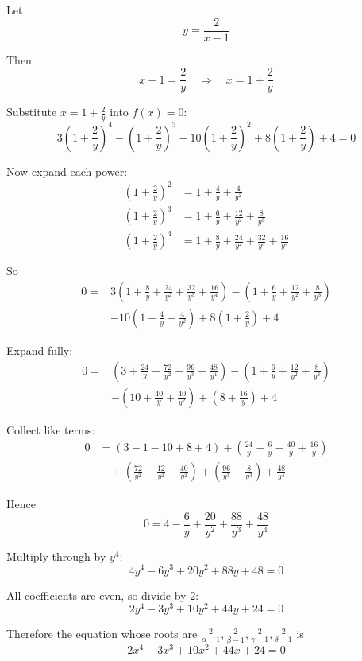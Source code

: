 \documentclass[leqno]{article}
\begin{document}
\begin{enumerate}[
  label=\textbf{\arabic*.},
  leftmargin=*,
  topsep=0pt,
  partopsep=0pt,
  parsep=0pt
]
\begin{djsSolution}
\begin{enumerate}[label=\textbf{(\alph*)}]
Let
\[
y=\frac{2}{x-1}
\]

Then
\[
x-1=\frac{2}{y}\quad\Longrightarrow\quad x=1+\frac{2}{y}
\]

Substitute \(x=1+\frac{2}{y}\) into \(f(x)=0\):
\[
3\left(1+\frac{2}{y}\right)^4-\left(1+\frac{2}{y}\right)^3-10\left(1+\frac{2}{y}\right)^2+8\left(1+\frac{2}{y}\right)+4=0
\]

Now expand each power:
\begin{align*}
\left(1+\frac{2}{y}\right)^2&=1+\frac{4}{y}+\frac{4}{y^2} \\
\left(1+\frac{2}{y}\right)^3&=1+\frac{6}{y}+\frac{12}{y^2}+\frac{8}{y^3} \\
\left(1+\frac{2}{y}\right)^4&=1+\frac{8}{y}+\frac{24}{y^2}+\frac{32}{y^3}+\frac{16}{y^4}
\end{align*}

So
\begin{align*}
0={}&3\left(1+\frac{8}{y}+\frac{24}{y^2}+\frac{32}{y^3}+\frac{16}{y^4}\right)
-\left(1+\frac{6}{y}+\frac{12}{y^2}+\frac{8}{y^3}\right) \\
&-10\left(1+\frac{4}{y}+\frac{4}{y^2}\right)
+8\left(1+\frac{2}{y}\right)+4
\end{align*}

Expand fully:
\begin{align*}
0={}&\left(3+\frac{24}{y}+\frac{72}{y^2}+\frac{96}{y^3}+\frac{48}{y^4}\right)
-\left(1+\frac{6}{y}+\frac{12}{y^2}+\frac{8}{y^3}\right) \\
&-\left(10+\frac{40}{y}+\frac{40}{y^2}\right)
+\left(8+\frac{16}{y}\right)+4
\end{align*}

Collect like terms:
\begin{align*}
0&=\left(3-1-10+8+4\right)
+\left(\frac{24}{y}-\frac{6}{y}-\frac{40}{y}+\frac{16}{y}\right) \\
&\quad+\left(\frac{72}{y^2}-\frac{12}{y^2}-\frac{40}{y^2}\right)
+\left(\frac{96}{y^3}-\frac{8}{y^3}\right)
+\frac{48}{y^4}
\end{align*}

Hence
\[
0=4-\frac{6}{y}+ \frac{20}{y^2}+\frac{88}{y^3}+\frac{48}{y^4}
\]

Multiply through by \(y^4\):
\[
4y^4-6y^3+20y^2+88y+48=0
\]

All coefficients are even, so divide by \(2\):
\[
2y^4-3y^3+10y^2+44y+24=0
\]

Therefore the equation whose roots are
\(\frac{2}{\alpha-1},\frac{2}{\beta-1},\frac{2}{\gamma-1},\frac{2}{\delta-1}\) is
\[
2x^4-3x^3+10x^2+44x+24=0
\]
\end{enumerate}
\end{djsSolution}



\end{enumerate}
\end{document}
